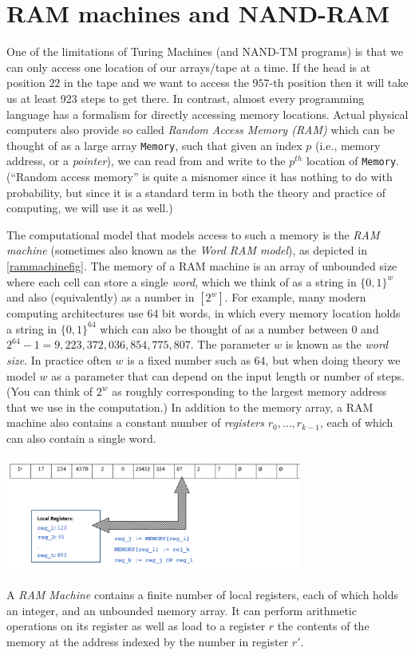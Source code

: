 \section{RAM machines and NAND-RAM}\label{RAM-machines-and-NAND-RAM}

One of the limitations of Turing Machines (and NAND-TM programs) is that
we can only access one location of our arrays/tape at a time. If the
head is at position \(22\) in the tape and we want to access the
\(957\)-th position then it will take us at least 923 steps to get
there. In contrast, almost every programming language has a formalism
for directly accessing memory locations. Actual physical computers also
provide so called \emph{Random Access Memory (RAM)} which can be thought
of as a large array \texttt{Memory}, such that given an index \(p\)
(i.e., memory address, or a \emph{pointer}), we can read from and write
to the \(p^{th}\) location of \texttt{Memory}. (``Random access memory''
is quite a misnomer since it has nothing to do with probability, but
since it is a standard term in both the theory and practice of
computing, we will use it as well.)

The computational model that models access to such a memory is the
\emph{RAM machine} (sometimes also known as the \emph{Word RAM model}),
as depicted in \cref{rammachinefig}. The memory of a RAM machine is an
array of unbounded size where each cell can store a single \emph{word},
which we think of as a string in \(\{0,1\}^w\) and also (equivalently)
as a number in \([2^w]\). For example, many modern computing
architectures use \(64\) bit words, in which every memory location holds
a string in \(\{0,1\}^{64}\) which can also be thought of as a number
between \(0\) and \(2^{64}-1= 9,223,372,036,854,775,807\). The parameter
\(w\) is known as the \emph{word size}. In practice often \(w\) is a
fixed number such as \(64\), but when doing theory we model \(w\) as a
parameter that can depend on the input length or number of steps. (You
can think of \(2^w\) as roughly corresponding to the largest memory
address that we use in the computation.) In addition to the memory
array, a RAM machine also contains a constant number of \emph{registers}
\(r_0,\ldots,r_{k-1}\), each of which can also contain a single word.


\begin{marginfigure}
\centering
\includegraphics[width=\linewidth, height=1.5in, keepaspectratio]{../figure/rammachine.png}
\caption{A \emph{RAM Machine} contains a finite number of local
registers, each of which holds an integer, and an unbounded memory
array. It can perform arithmetic operations on its register as well as
load to a register \(r\) the contents of the memory at the address
indexed by the number in register \(r'\).}
\label{rammachinefig}
\end{marginfigure}

